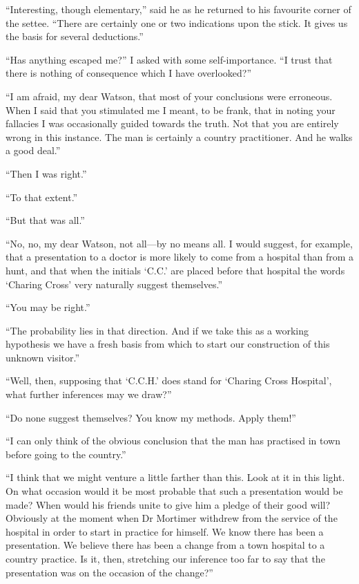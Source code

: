 \documentclass[paper=5.5in:8.5in,BCOR=7mm,twoside,DIV=calc,12pt,usegeometry,openany,chapterprefix,endperiod,headings=big]{scrbook} %
\begin{document}
\enquote{Interesting, though elementary,} said he as he returned to his favourite corner of the settee. \enquote{There are certainly one or two indications upon the stick. It gives us the basis for several deductions.}

\enquote{Has anything escaped me?} I asked with some self-importance. \enquote{I trust that there is nothing of consequence which I have overlooked?}

\enquote{I am afraid, my dear Watson, that most of your conclusions were erroneous. When I said that you stimulated me I meant, to be frank, that in noting your fallacies I was occasionally guided towards the truth. Not that you are entirely wrong in this instance. The man is certainly a country practitioner. And he walks a good deal.}

\enquote{Then I was right.}

\enquote{To that extent.}

\enquote{But that was all.}

\enquote{No, no, my dear Watson, not all---by no means all. I would suggest, for example, that a presentation to a doctor is more likely to come from a hospital than from a hunt, and that when the initials \enquote{C.C.} are placed before that hospital the words \enquote{Charing Cross} very naturally suggest themselves.}

\enquote{You may be right.}

\enquote{The probability lies in that direction. And if we take this as a working hypothesis we have a fresh basis from which to start our construction of this unknown visitor.}

\enquote{Well, then, supposing that \enquote{C.C.H.} does stand for \enquote{Charing Cross Hospital}, what further inferences may we draw?}

\enquote{Do none suggest themselves? You know my methods. Apply them!}

\enquote{I can only think of the obvious conclusion that the man has practised in town before going to the country.}

\enquote{I think that we might venture a little farther than this. Look at it in this light. On what occasion would it be most probable that such a presentation would be made? When would his friends unite to give him a pledge of their good will? Obviously at the moment when Dr Mortimer withdrew from the service of the hospital in order to start in practice for himself. We know there has been a presentation. We believe there has been a change from a town hospital to a country practice. Is it, then, stretching our inference too far to say that the presentation was on the occasion of the change?}
\end{document}
